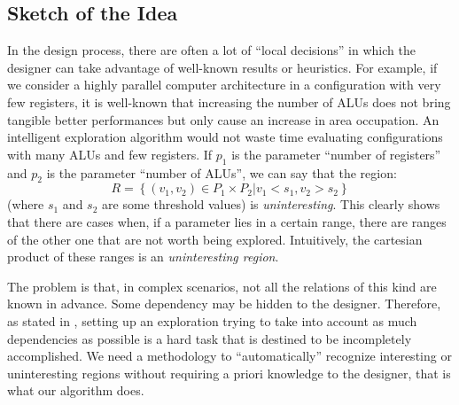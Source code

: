 \subsection{Sketch of the Idea}

In the design process, there are often a lot of ``local decisions'' in
which the designer can take advantage of well-known results or
heuristics. For example, if we consider a highly parallel
computer architecture in a configuration with very few registers, it is
well-known that increasing the number of ALUs does not bring tangible
better performances but only cause an increase in area occupation. An
intelligent exploration algorithm would not waste time evaluating
configurations with many ALUs and few registers. If $p_{1}$ is the
parameter ``number of registers'' and $p_{2}$ is the parameter
``number of ALUs'', we can say that the region:
\[
R=\left\{ \left.\left(v_{1},v_{2}\right)\in P_{1}\times P_{2}\right|v_{1}<s_{1},v_{2}>s_{2}\right\} 
\]
 (where $s_{1}$ and $s_{2}$ are some threshold values) is \emph{uninteresting}. This clearly shows that there are cases when, if a parameter lies in
a certain range, there are ranges of the other one that are not worth being explored. Intuitively, the cartesian product of these ranges is an \emph{uninteresting region}.

The problem is that, in complex scenarios, not all the relations of this
kind are known in advance. Some dependency may be hidden
to the designer.
Therefore, as stated in ,
setting up an exploration trying to take into account as much dependencies
as possible is a hard task that is destined to be incompletely
accomplished. We need a methodology to ``automatically'' recognize
interesting or uninteresting regions without requiring a priori knowledge
to the designer, that is what our algorithm does.

